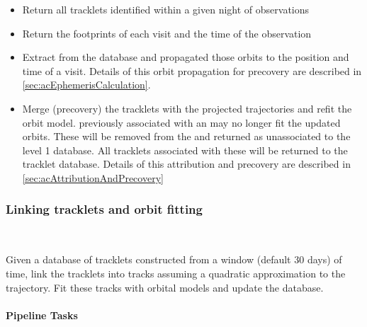 \begin{itemize}
\item Return all tracklets identified within a given night of observations
\item Return the footprints of each visit and the time of the observation
\item Extract \SSObjects from the \SSObject database and propagated those orbits to the position and time of a visit. Details of this orbit propagation for precovery are described in \ref{sec:acEphemerisCalculation}. 
\item Merge (precovery) the tracklets with the projected \SSObject trajectories and refit  the \SSObject orbit model. \DIASources previously associated with an \SSObject may no longer fit the updated \SSObject orbits. These \DIASources will be removed from the \SSObject and returned as unassociated \DIAObjects to the level 1 database. All tracklets associated with these \DIAObjects will be  returned to the tracklet database. Details of this attribution and precovery are described in \ref{sec:acAttributionAndPrecovery}
\end{itemize}

\subsubsection{Linking tracklets and orbit fitting}~

Given a database of tracklets constructed from a window (default 30 days) of time, link the tracklets into tracks assuming a quadratic approximation to the trajectory. Fit these tracks with orbital models and update the \SSObject database.

\paragraph{Pipeline Tasks}

